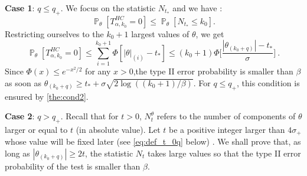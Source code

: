 \documentclass[twoside,11pt]{article}
\renewcommand{\P}{\operatorname{\mathbb{P}}}
\newcommand{\<}{\langle}
\renewcommand{\>}{\rangle}
\begin{document}
\medskip

\noindent 
{\bf Case 1}: $q\leq q_+$. We focus on the statistic $N_{t_{*}}$ and we have :
 \[
 \P_{\theta}[T^{HC}_{\alpha,k_0} = 0] \leq \P_{\theta}[N_{t_{*}}\leq k_0].
 \]
 Restricting ourselves to the $k_0+1$ largest values of $\theta$, we get
 \[
 \P_{\theta}[T^{HC}_{\alpha,k_0} = 0] \leq \sum_{i=1}^{k_0+1} \Phi[|\theta|_{(i)}-t_{*}]\leq (k_0+1)\Phi\Big[\frac{|\theta_{(k_0+q)}|-t_{*}}{\sigma}\Big]\ .
 \]
 Since $\Phi(x)\leq e^{-x^2/2}$ for any $x>0$,the type II error probability is smaller than $\beta$ as soon as $\theta_{(k_0+q)}\geq t_{*}+ \sigma \sqrt{2\log((k_0+1)/\beta)}$. 
  For $q\leq q_+$, this condition is ensured by  \eqref{the:cond2}. 
 
 
\bigskip 


\noindent 
{\bf Case 2}: $q> q_+ $. Recall that for $t>0$, $N_t^{\theta}$ refers to the number of components of $\theta$ larger or equal to $t$ (in absolute value). 
Let $t$ be a positive integer larger than $4\sigma_+$ whose value will be fixed later (see \eqref{eq:def_t_0q} below) . We shall prove that, as long as $|\theta_{(k_0+q)}|\geq 2t$, the statistic $N_t$ takes large values so that the type II error probability of the test is smaller than $\beta$. 
\end{document}

